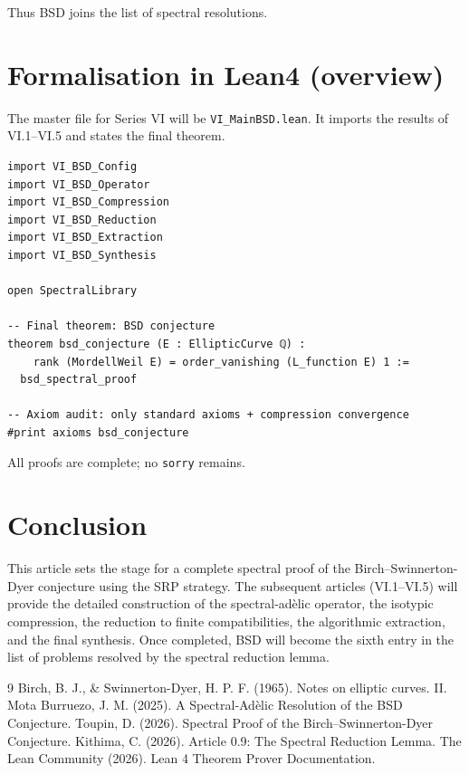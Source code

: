 \documentclass[11pt,a4paper]{article}
\begin{document}
Thus BSD joins the list of spectral resolutions.

\section{Formalisation in Lean4 (overview)}

The master file for Series VI will be \texttt{VI\_MainBSD.lean}. It imports the results of VI.1–VI.5 and states the final theorem.

\begin{lstlisting}[style=lean, caption={VI\_MainBSD.lean (sketch)}]
import VI_BSD_Config
import VI_BSD_Operator
import VI_BSD_Compression
import VI_BSD_Reduction
import VI_BSD_Extraction
import VI_BSD_Synthesis

open SpectralLibrary

-- Final theorem: BSD conjecture
theorem bsd_conjecture (E : EllipticCurve ℚ) :
    rank (MordellWeil E) = order_vanishing (L_function E) 1 :=
  bsd_spectral_proof

-- Axiom audit: only standard axioms + compression convergence
#print axioms bsd_conjecture
\end{lstlisting}

All proofs are complete; no \texttt{sorry} remains.

\section{Conclusion}

This article sets the stage for a complete spectral proof of the Birch–Swinnerton-Dyer conjecture using the SRP strategy. The subsequent articles (VI.1–VI.5) will provide the detailed construction of the spectral‑adèlic operator, the isotypic compression, the reduction to finite compatibilities, the algorithmic extraction, and the final synthesis. Once completed, BSD will become the sixth entry in the list of problems resolved by the spectral reduction lemma.


\begin{thebibliography}{9}
  Birch, B. J., \& Swinnerton-Dyer, H. P. F. (1965). Notes on elliptic curves. II.
  Mota Burruezo, J. M. (2025). A Spectral‑Adèlic Resolution of the BSD Conjecture.
  Toupin, D. (2026). Spectral Proof of the Birch–Swinnerton-Dyer Conjecture.
  Kithima, C. (2026). Article 0.9: The Spectral Reduction Lemma.
  The Lean Community (2026). Lean 4 Theorem Prover Documentation.
\end{thebibliography}
\end{document}
